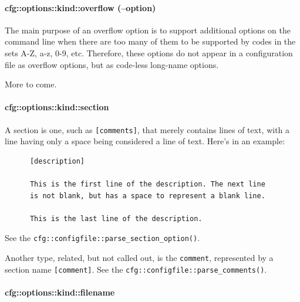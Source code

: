 \paragraph{cfg::options::kind::overflow (--option)}
\label{paragraph:cfg_namespace_options_kind_overflow}

   The main purpose of an overflow option is to support
   additional options on the command line
   when there are too many of them to be supported
   by codes in the sets A-Z, a-z, 0-9, etc.
   Therefore, these options do not appear in a configuration
   file as overflow options, but as code-less long-name
   options.

   More to come.

\paragraph{cfg::options::kind::section}
\label{paragraph:cfg_namespace_options_kind_section}

   A section is one, such as \texttt{[comments]},
   that merely contains lines of text, with a line
   having only a space being considered a line of text.
   Here's in an example:

   \begin{verbatim}
      [description]

      This is the first line of the description. The next line
      is not blank, but has a space to represent a blank line.

      This is the last line of the description.
   \end{verbatim}

   See the \texttt{cfg::configfile::parse\_section\_option()}.

%
%

   Another type, related, but not called out,
   is the \texttt{comment}, represented by a section
   name \texttt{[comment]}.
   See the \texttt{cfg::configfile::parse\_comments()}.

%
%

\paragraph{cfg::options::kind::filename}
\label{paragraph:cfg_namespace_options_kind_filename}


